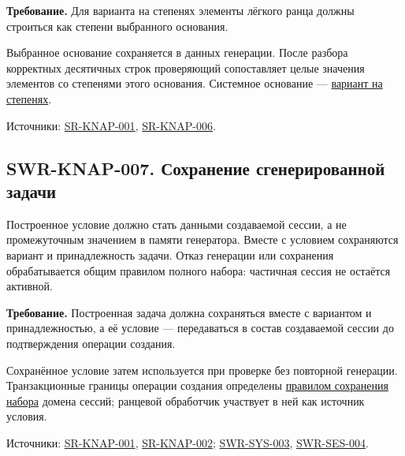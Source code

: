 \documentclass[12pt,a4paper]{article}
\begin{document}
\textbf{Требование.} Для варианта на степенях элементы лёгкого ранца должны строиться как степени выбранного основания.

Выбранное основание сохраняется в данных генерации. После разбора корректных десятичных строк проверяющий сопоставляет целые значения элементов со степенями этого основания. Системное основание --- {\href{../04\_Системные\_требования/DOC-05\_Системные\_требования.pdf\#sr-knap-006-вариант-на-степенях}{вариант на степенях}}.

Источники: {\href{../04\_Системные\_требования/DOC-05\_Системные\_требования.pdf\#sr-knap-001}{SR-KNAP-001}}, {\href{../04\_Системные\_требования/DOC-05\_Системные\_требования.pdf\#sr-knap-006}{SR-KNAP-006}}.

\subsection{SWR-KNAP-007. Сохранение сгенерированной задачи}\label{swr-knap-007-ux441ux43eux445ux440ux430ux43dux435ux43dux438ux435-ux441ux433ux435ux43dux435ux440ux438ux440ux43eux432ux430ux43dux43dux43eux439-ux437ux430ux434ux430ux447ux438}

\hypertarget{swr-knap-007-сохранение-сгенерированной-задачи}{}

\hypertarget{swr-knap-007}{}

Построенное условие должно стать данными создаваемой сессии, а не промежуточным значением в памяти генератора. Вместе с условием сохраняются вариант и принадлежность задачи. Отказ генерации или сохранения обрабатывается общим правилом полного набора: частичная сессия не остаётся активной.

\textbf{Требование.} Построенная задача должна сохраняться вместе с вариантом и принадлежностью, а её условие --- передаваться в состав создаваемой сессии до подтверждения операции создания.

Сохранённое условие затем используется при проверке без повторной генерации. Транзакционные границы операции создания определены {\href{DOC-06.2\_Сессии\_задач\_и\_планировщик.pdf\#swr-ses-005-сохранение-созданного-набора}{правилом сохранения набора}} домена сессий; ранцевой обработчик участвует в ней как источник условия.

Источники: {\href{../04\_Системные\_требования/DOC-05\_Системные\_требования.pdf\#sr-knap-001}{SR-KNAP-001}}, {\href{../04\_Системные\_требования/DOC-05\_Системные\_требования.pdf\#sr-knap-002}{SR-KNAP-002}}; {\href{DOC-06\_Программные\_требования.pdf\#swr-sys-003}{SWR-SYS-003}}, {\href{DOC-06.2\_Сессии\_задач\_и\_планировщик.pdf\#swr-ses-004}{SWR-SES-004}}.
\end{document}
